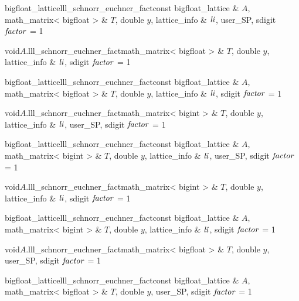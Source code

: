 \begin{fcode}{bigfloat_lattice}{lll_schnorr_euchner_fact}{const bigfloat_lattice & $A$,
    math_matrix< bigfloat > & $T$, double $y$, lattice_info & $\mathit{li}$, user_SP, sdigit $\mathit{factor}$ = 1}%
\end{fcode}

\begin{fcode}{void}{$A$.lll_schnorr_euchner_fact}{math_matrix< bigfloat > & $T$, double $y$,
    lattice_info & $\mathit{li}$, sdigit $\mathit{factor}$ = 1}%
\end{fcode}

\begin{fcode}{bigfloat_lattice}{lll_schnorr_euchner_fact}{const bigfloat_lattice & $A$,
    math_matrix< bigfloat > & $T$, double $y$, lattice_info & $\mathit{li}$, sdigit $\mathit{factor}$ = 1}%
\end{fcode}

\begin{fcode}{void}{$A$.lll_schnorr_euchner_fact}{math_matrix< bigint > & $T$, double $y$,
    lattice_info & $\mathit{li}$, user_SP, sdigit $\mathit{factor}$ = 1}%
\end{fcode}

\begin{fcode}{bigfloat_lattice}{lll_schnorr_euchner_fact}{const bigfloat_lattice & $A$,
    math_matrix< bigint > & $T$, double $y$, lattice_info & $\mathit{li}$, user_SP, sdigit $\mathit{factor}$ = 1}%
\end{fcode}

\begin{fcode}{void}{$A$.lll_schnorr_euchner_fact}{math_matrix< bigint > & $T$, double $y$,
    lattice_info & $\mathit{li}$, sdigit $\mathit{factor}$ = 1}%
\end{fcode}

\begin{fcode}{bigfloat_lattice}{lll_schnorr_euchner_fact}{const bigfloat_lattice & $A$,
    math_matrix< bigint > & $T$, double $y$, lattice_info & $\mathit{li}$, sdigit $\mathit{factor}$ = 1}%
\end{fcode}

\begin{fcode}{void}{$A$.lll_schnorr_euchner_fact}{math_matrix< bigfloat > & $T$, double $y$,
    user_SP, sdigit $\mathit{factor}$ = 1}%
\end{fcode}

\begin{fcode}{bigfloat_lattice}{lll_schnorr_euchner_fact}{const bigfloat_lattice & $A$,
    math_matrix< bigfloat > & $T$, double $y$, user_SP, sdigit $\mathit{factor}$ = 1}%
\end{fcode}

